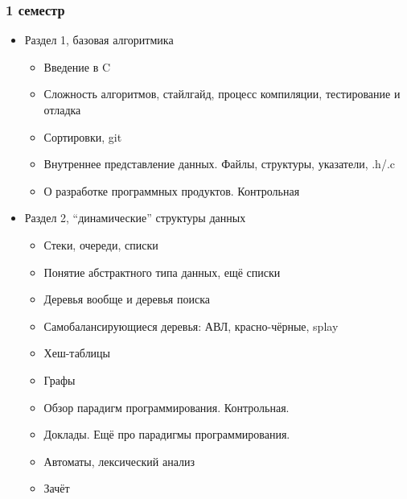 \documentclass[xetex,mathserif,serif]{beamer}
\begin{document}
    \begin{frame}
        \frametitle{1 семестр}
        \begin{scriptsize}
            \begin{itemize}
                \item Раздел 1, базовая алгоритмика
                \begin{itemize}
                    \item \scriptsize{Введение в C}
                    \item Сложность алгоритмов, стайлгайд, процесс компиляции, тестирование и отладка
                    \item Сортировки, git
                    \item Внутреннее представление данных. Файлы, структуры, указатели, .h/.c
                    \item О разработке программных продуктов. Контрольная
                \end{itemize}
                \item Раздел 2, ``динамические'' структуры данных
                \begin{scriptsize}
                    \begin{itemize}
                        \item \scriptsize{Стеки, очереди, списки}
                        \item Понятие абстрактного типа данных, ещё списки
                        \item Деревья вообще и деревья поиска
                        \item Самобалансирующиеся деревья: АВЛ, красно-чёрные, splay
                        \item Хеш-таблицы
                        \item Графы
                        \item Обзор парадигм программирования. Контрольная.
                        \item Доклады. Ещё про парадигмы программирования.
                        \item Автоматы, лексический анализ
                        \item Зачёт
                    \end{itemize}
                \end{scriptsize}
            \end{itemize}
        \end{scriptsize}
    \end{frame}
\end{document}
